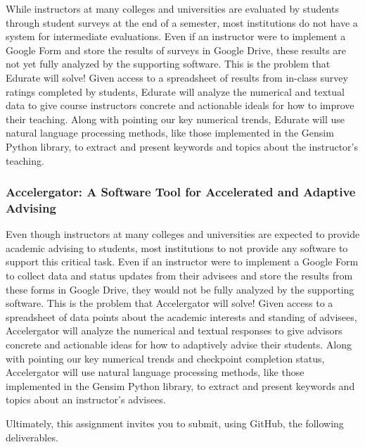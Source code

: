 \documentclass[11pt]{article}
\begin{document}
While instructors at many colleges and universities are evaluated by students through student surveys at the end of a
semester, most institutions do not have a system for intermediate evaluations. Even if an instructor were to implement a
Google Form and store the results of surveys in Google Drive, these results are not yet fully analyzed by the supporting
software. This is the problem that Edurate will solve! Given access to a spreadsheet of results from in-class survey
ratings completed by students, Edurate will analyze the numerical and textual data to give course instructors concrete
and actionable ideals for how to improve their teaching. Along with pointing our key numerical trends, Edurate will use
natural language processing methods, like those implemented in the Gensim Python library, to extract and present
keywords and topics about the instructor's teaching.

\vspace*{-.5em}

\subsubsection*{Accelergator: A Software Tool for Accelerated and Adaptive Advising}

Even though instructors at many colleges and universities are expected to provide academic advising to students, most
institutions to not provide any software to support this critical task. Even if an instructor were to implement a Google
Form to collect data and status updates from their advisees and store the results from these forms in Google Drive, they
would not be fully analyzed by the supporting software. This is the problem that Accelergator will solve! Given access
to a spreadsheet of data points about the academic interests and standing of advisees, Accelergator will analyze the
numerical and textual responses to give advisors concrete and actionable ideas for how to adaptively advise their
students. Along with pointing our key numerical trends and checkpoint completion status, Accelergator will use natural
language processing methods, like those implemented in the Gensim Python library, to extract and present keywords and
topics about an instructor's advisees.

Ultimately, this assignment invites you to submit, using GitHub, the following deliverables.

\vspace*{-.5em}
\end{document}
